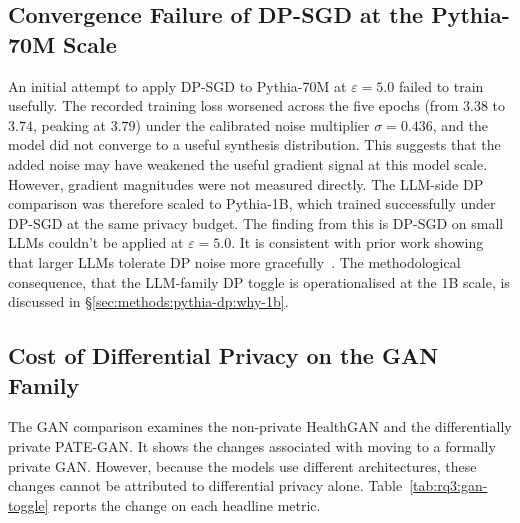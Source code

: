 \subsection{Convergence Failure of DP-SGD at the Pythia-70M Scale}
\label{sec:results:rq3:pythia-70m-failure}

An initial attempt to apply DP-SGD to Pythia-70M at $\varepsilon = 5.0$
failed to train usefully. The recorded training loss worsened across the
five epochs (from $3.38$ to $3.74$, peaking at $3.79$) under the
calibrated noise multiplier $\sigma = 0.436$, and the model did not
converge to a useful synthesis distribution. This suggests that the 
added noise may have weakened the useful gradient
signal at this model scale. However, gradient magnitudes were not measured
directly. The LLM-side DP comparison was therefore scaled to
Pythia-1B, which trained successfully under DP-SGD at the same privacy
budget. The finding from this is DP-SGD on small LLMs couldn't be 
applied at $\varepsilon = 5.0$. It is consistent with prior work
showing that larger LLMs tolerate DP noise more
gracefully~\cite{Li2022LargeDP}. The methodological consequence, that the
LLM-family DP toggle is operationalised at the 1B scale, is discussed in
\S\ref{sec:methods:pythia-dp:why-1b}.

\subsection{Cost of Differential Privacy on the GAN Family}
\label{sec:results:rq3:gan-toggle}

The GAN comparison examines the non-private HealthGAN and the
differentially private PATE-GAN. It shows the changes associated with
moving to a formally private GAN. However, because the models use
different architectures, these changes cannot be attributed to
differential privacy alone.
Table~\ref{tab:rq3:gan-toggle} reports the change on each headline metric.


